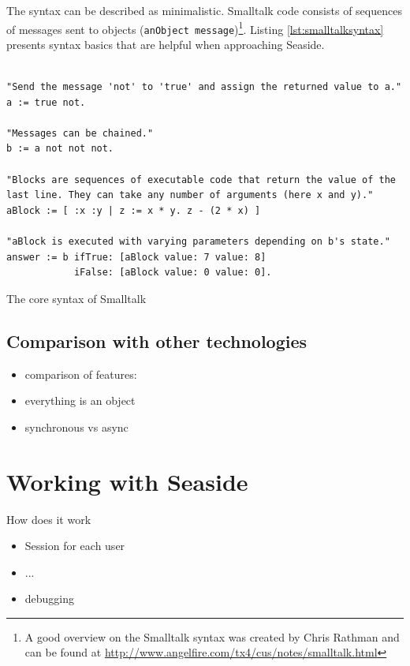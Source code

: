 \documentclass[a4paper,12pt,pagesize,headsepline,oribibl,titlepage]{scrartcl}
\begin{document}
The syntax can be described as minimalistic. Smalltalk code consists of sequences of messages sent to objects (\texttt{anObject message})\footnote{A good overview on the Smalltalk syntax was created by Chris Rathman and can be found at \url{http://www.angelfire.com/tx4/cus/notes/smalltalk.html}}. Listing \ref{lst:smalltalksyntax} presents syntax basics that are helpful when approaching Seaside.  


\begin{listing}[]%
\begin{verbatim}

"Send the message 'not' to 'true' and assign the returned value to a."
a := true not.

"Messages can be chained."
b := a not not not.

"Blocks are sequences of executable code that return the value of the 
last line. They can take any number of arguments (here x and y)."
aBlock := [ :x :y | z := x * y. z - (2 * x) ]

"aBlock is executed with varying parameters depending on b's state."
answer := b ifTrue: [aBlock value: 7 value: 8] 
            iFalse: [aBlock value: 0 value: 0].

\end{verbatim}
\caption{The core syntax of Smalltalk}
\label{lst:smalltalksyntax}
\end{listing}

\subsection{Comparison with other technologies}

\begin{itemize}
\item comparison of features:
\item everything is an object
\item synchronous vs async
\end{itemize}


\section{Working with Seaside}
\label{sec:workflow}

How does it work\cite{perscheid2008introduction}

\begin{itemize}
\item Session for each user
\item ...
\item debugging
\end{itemize}
\end{document}
